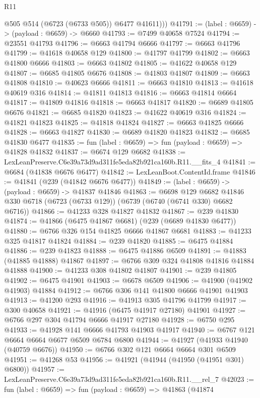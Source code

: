 \begin{lexlean}{R11}
\begin{coremodule}
          @505
          @514
          (@6723 (@6733 @505))
          @6477
          @41611)))
@41791 := (label : @6659) -> (payload : @6659) -> @6660
@41793 := @7499 @40658 @7524
@41794 := @23551 @41793
@41796 := @6663 @41794 @6666
@41797 := @6663 @41796
@41799 := @41618 @40658 @129
@41800 := @41797 @41799
@41802 := @6663 @41800 @6666
@41803 := @6663 @41802
@41805 := @41622 @40658 @129
@41807 := @6685 @41805 @6676
@41808 := @41803 @41807
@41809 := @6663 @41808
@41810 := @40623 @6666
@41811 := @6663 @41810
@41813 := @41618 @40619 @316
@41814 := @41811 @41813
@41816 := @6663 @41814 @6664
@41817 := @41809 @41816
@41818 := @6663 @41817
@41820 := @6689 @41805 @6676
@41821 := @6685 @41820
@41823 := @41622 @40619 @316
@41824 := @41821 @41823
@41825 := @41818 @41824
@41827 := @6663 @41825 @6666
@41828 := @6663 @41827
@41830 := @6689 @41820 @41823
@41832 := @6685 @41830 @6477
@41835 := fun (label : @6659) => fun (payload : @6659) => @41828 @41832
@41837 := @6674 @129 @6682
@41838 := LexLeanPreserve.C6e39a73d9ad311fe5eda82b921ca160b.R11.__fits_4
@41841 := @6684 (@41838 @6676 @6477)
@41842 := LexLeanBoot.ContentId.frame
@41846 := @41841 (@239 (@41842 @6676 @6477))
@41849 := (label : @6659) -> (payload : @6659) -> @41837 @41846
@41863 := @6698
    @129
    @6682
    @41846
    @330
    @6718
    (@6723 (@6733 @129))
    (@6739 (@6740 (@6741 @330) @6682 @6716))
@41866 := @41233 @328 @41827 @41832
@41867 := @239 @41830
@41874 := @41866 (@6475 @41867 @6681) (@239 (@6689 @41830 @6477))
@41880 := @6766 @326 @154 @41825 @6666 @41867 @6681
@41883 := @41233 @325 @41817 @41824
@41884 := @239 @41820
@41885 := @6475 @41884
@41886 := @239 @41823
@41888 := @6475 @41886 @6509
@41891 := @41883 (@41885 @41888) @41867
@41897 := @6766 @309 @324 @41808 @41816 @41884 @41888
@41900 := @41233 @308 @41802 @41807
@41901 := @239 @41805
@41902 := @6475 @41901
@41903 := @6678 @6509
@41906 := @41900 (@41902 @41903) @41884
@41912 := @6766 @306 @141 @41800 @6666 @41901 @41903
@41913 := @41200 @293
@41916 := @41913 @305 @41796 @41799
@41917 := @300 @40658
@41921 := @41916 (@6475 @41917 @27180) @41901
@41927 := @6766 @297 @304 @41794 @6666 @41917 @27180
@41928 := @6750 @295
@41933 := @41928 @141 @6666 @41793 @41903 @41917
@41940 := @6767 @121 @6664 @6664 @6677 @6509 @6784 @6800
@41944 := @41927 (@41933 @41940 (@40759 @6676))
@41950 := @6766 @302 @121 @6664 @6664 @301 @6509
@41951 := @41268 @53
@41956 := @41921 (@41944 (@41950 (@41951 @301) @6800))
@41957 := LexLeanPreserve.C6e39a73d9ad311fe5eda82b921ca160b.R11.__rel_7
@42023 := fun (label : @6659) =>
  fun (payload : @6659) =>
  @41863
    (@41874

\end{coremodule}
\end{lexlean}
